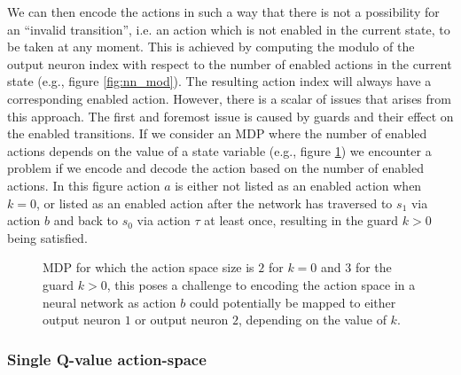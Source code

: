 We can then encode the actions in such a way that there is not a possibility for an ``invalid transition'', i.e. an action which is not enabled in the current state, to be taken at any moment. This is achieved by computing the modulo of the output neuron index with respect to the number of enabled actions in the current state (e.g., figure \ref{fig:nn_mod}). The resulting action index will always have a corresponding enabled action. However, there is a scalar of issues that arises from this approach. The first and foremost issue is caused by guards and their effect on the enabled transitions. If we consider an MDP where the number of enabled actions depends on the value of a state variable (e.g., figure \ref{fig:mdp_enabled_action_count}) we encounter a problem if we encode and decode the action based on the number of enabled actions. In this figure action $a$ is either not listed as an enabled action when $k = 0$, or listed as an enabled action after the network has traversed to $s_1$ via action $b$ and back to $s_0$ via action $\tau$ at least once, resulting in the guard $k > 0$ being satisfied.

\begin{figure}
    \centering
    \caption{MDP for which the action space size is $2$ for $k = 0$ and $3$ for the guard $k > 0$, this poses a challenge to encoding the action space in a neural network as action $b$ could potentially be mapped to either output neuron $1$ or output neuron $2$, depending on the value of $k$.}
    \label{fig:mdp_enabled_action_count}
\end{figure}

\subsubsection{Single Q-value action-space}

